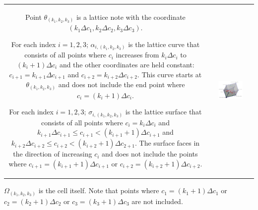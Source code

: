 \documentclass{book}
\begin{document}
\vspace{1mm}

\begin{tabular}{cc}
\parbox{0.4\textwidth}{
Point \(\theta_{(k_1, k_2, k_3)}\) is a lattice note with the coordinate \((k_1 \Delta c_1, k_2 \Delta c_2, k_3 \Delta c_3)\). 

\vspace{1mm}

For each index \(i = 1, 2, 3\); \(\alpha_{i, (k_1, k_2, k_3)}\) is the lattice curve that consists of all points where \(c_i\) increases from \(k_i \Delta c_i\) to \((k_i + 1)\Delta c_i\) and the other coordinates are held constant: \(c_{i+1} = k_{i+1} \Delta c_{i+1}\) and \(c_{i+2} = k_{i+2} \Delta c_{i+2}\). This curve starts at \(\theta_{(k_1, k_2, k_3)}\) and does not include the end point where \(c_i = (k_i + 1)\Delta c_i\).

\vspace{1mm}

For each index \(i = 1, 2, 3\); \(\sigma_{i, (k_1, k_2, k_3)}\) is the lattice surface that consists of all points where \(c_i = k_i \Delta c_i\) and \(k_{i+1} \Delta c_{i+1} \leq c_{i+1} < (k_{i+1} + 1) \Delta c_{i+1}\) and \(k_{i+2} \Delta c_{i+2} \leq c_{i+2} < (k_{i+2} + 1) \Delta c_{2+1}\). The surface faces in the direction of increasing \(c_i\) and does not include the points where \(c_{i+1} = (k_{i+1} + 1)\Delta c_{i + 1}\) or \(c_{i+2} = (k_{i+2} + 1)\Delta c_{i + 2}\).
} & \parbox{0.6\textwidth}{
\includegraphics[width = 0.6\textwidth]{Coordinate_systems/coordinate_system_cell_2}
}
\end{tabular}

\vspace{1mm}

\(\Omega_{(k_1, k_2, k_3)}\) is the cell itself. Note that points where \(c_1 = (k_1 + 1)\Delta c_1\) or \(c_2 = (k_2 + 1)\Delta c_2\) or \(c_3 = (k_3 + 1)\Delta c_3\) are not included.
\end{document}
